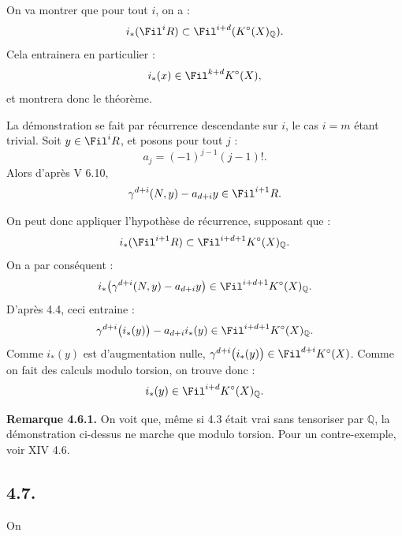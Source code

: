 On va
montrer que pour tout \(i\), on a :
\[
  i_*(\Fil^iR)\subset \Fil^{i+d}(K^\circ(X)_{\mathbb Q}).
\]
Cela entrainera en particulier :
\[
  i_*(x)\in\Fil^{k+d}K^\circ(X),
\]
et montrera donc le théorème.

La démonstration se fait par récurrence descendante sur \(i\), le cas \(i=m\) étant trivial. Soit \(y\in\Fil^iR\), et posons pour tout \(j\) :
\[
  a_j=(-1)^{j-1}(j-1)!.
\]
Alors d'après V 6.10,
\[
  \gamma^{d+i}(N,y)-a_{d+i}y\in\Fil^{i+1}R.
\]

On peut donc appliquer l'hypothèse de récurrence, supposant que :
\[
  i_*(\Fil^{i+1}R)\subset \Fil^{i+d+1}K^\circ(X)_{\mathbb Q}.
\]
On a par conséquent :
\[
  i_*\bigl(\gamma^{d+i}(N,y)-a_{d+i}y\bigr)
  \in\Fil^{i+d+1}K^\circ(X)_{\mathbb Q}.
\]
D'après 4.4, ceci entraine :
\[
  \gamma^{d+i}\bigl(i_*(y)\bigr)-a_{d+i}i_*(y)
  \in\Fil^{i+d+1}K^\circ(X)_{\mathbb Q}.
\]
Comme \(i_*(y)\) est d'augmentation nulle, \(\gamma^{d+i}\bigl(i_*(y)\bigr)\in\Fil^{d+i}K^\circ(X)\).
Comme on fait des calculs modulo torsion, on trouve donc :
\[
  i_*(y)\in\Fil^{i+d}K^\circ(X)_{\mathbb Q}.
\]

\textbf{Remarque 4.6.1.} On voit que, même si 4.3 était vrai sans tensoriser par \(\mathbb Q\), la démonstration ci-dessus ne marche que modulo torsion. Pour un contre-exemple, voir XIV 4.6.

\subsection*{4.7.}

On
